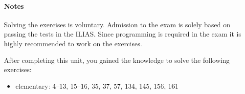 \documentclass[11pt,a4paper]{article}
\begin{document}
\paragraph{Notes}
Solving the exercises is voluntary.
Admission to the exam is solely based on passing the tests in the ILIAS.
Since programming is required in the exam
it is highly recommended to work on the exercises.

%

\begin{exercise}
    After completing this unit, you gained the knowledge to solve the following exercises:

    \begin{itemize}
        \item elementary: 4--13, 15--16, 35, 37, 57, 134, 145, 156, 161
    \end{itemize}
\end{exercise}
\end{document}
